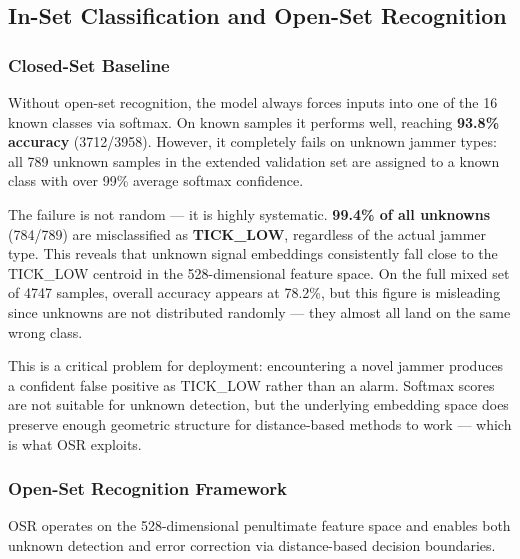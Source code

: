 \subsection{In-Set Classification and Open-Set Recognition}

\subsubsection{Closed-Set Baseline}

Without open-set recognition, the model always forces inputs into one of the 16 known classes via softmax. On known samples it performs well, reaching \textbf{93.8\% accuracy} (3712/3958). However, it completely fails on unknown jammer types: all 789 unknown samples in the extended validation set are assigned to a known class with over 99\% average softmax confidence.

The failure is not random — it is highly systematic. \textbf{99.4\% of all unknowns} (784/789) are misclassified as \textbf{TICK\_LOW}, regardless of the actual jammer type. This reveals that unknown signal embeddings consistently fall close to the TICK\_LOW centroid in the 528-dimensional feature space. On the full mixed set of 4747 samples, overall accuracy appears at 78.2\%, but this figure is misleading since unknowns are not distributed randomly — they almost all land on the same wrong class.

This is a critical problem for deployment: encountering a novel jammer produces a confident false positive as TICK\_LOW rather than an alarm. Softmax scores are not suitable for unknown detection, but the underlying embedding space does preserve enough geometric structure for distance-based methods to work — which is what OSR exploits.

\subsubsection{Open-Set Recognition Framework}

OSR operates on the 528-dimensional penultimate feature space and enables both unknown detection and error correction via distance-based decision boundaries.

